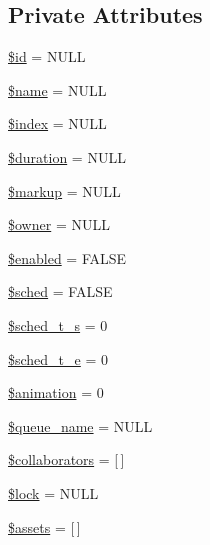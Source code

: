 \subsection*{Private Attributes}
\begin{DoxyCompactItemize}
\item 
\hyperlink{classlibresignage_1_1common_1_1php_1_1slide_1_1Slide_a7dd7de937f3bc73a1aadf56ca594fbdd}{\$id} = N\+U\+LL
\item 
\hyperlink{classlibresignage_1_1common_1_1php_1_1slide_1_1Slide_aa2936e4fd6eb208ce09d3d6987351d93}{\$name} = N\+U\+LL
\item 
\hyperlink{classlibresignage_1_1common_1_1php_1_1slide_1_1Slide_ad580560a42d379b63233bcd624d2025d}{\$index} = N\+U\+LL
\item 
\hyperlink{classlibresignage_1_1common_1_1php_1_1slide_1_1Slide_a2d650e91ab7423234d24955dff565cb8}{\$duration} = N\+U\+LL
\item 
\hyperlink{classlibresignage_1_1common_1_1php_1_1slide_1_1Slide_a254e9bd551ecdd771d99f50c43efb754}{\$markup} = N\+U\+LL
\item 
\hyperlink{classlibresignage_1_1common_1_1php_1_1slide_1_1Slide_aa70f5dd34e3605dfd0d298046eaa6e9d}{\$owner} = N\+U\+LL
\item 
\hyperlink{classlibresignage_1_1common_1_1php_1_1slide_1_1Slide_a819f22b6bc82f1a6961429ffea950e6e}{\$enabled} = F\+A\+L\+SE
\item 
\hyperlink{classlibresignage_1_1common_1_1php_1_1slide_1_1Slide_a8c6a04863a8424b9dc6957a843abe143}{\$sched} = F\+A\+L\+SE
\item 
\hyperlink{classlibresignage_1_1common_1_1php_1_1slide_1_1Slide_a976bff4c51294f1ab1ed91a84f993627}{\$sched\+\_\+t\+\_\+s} = 0
\item 
\hyperlink{classlibresignage_1_1common_1_1php_1_1slide_1_1Slide_adfcc309e69b9dd59eb92413fa1076d7e}{\$sched\+\_\+t\+\_\+e} = 0
\item 
\hyperlink{classlibresignage_1_1common_1_1php_1_1slide_1_1Slide_aecc8d50d071e37690946af8f814f9ff4}{\$animation} = 0
\item 
\hyperlink{classlibresignage_1_1common_1_1php_1_1slide_1_1Slide_af93ffac0cc6478cb95f66772785b08c8}{\$queue\+\_\+name} = N\+U\+LL
\item 
\hyperlink{classlibresignage_1_1common_1_1php_1_1slide_1_1Slide_acbc85425ac21b86ca870a8902b9f4594}{\$collaborators} = \mbox{[}$\,$\mbox{]}
\item 
\hyperlink{classlibresignage_1_1common_1_1php_1_1slide_1_1Slide_a94f554fe33375075dcfa3981750aedc2}{\$lock} = N\+U\+LL
\item 
\hyperlink{classlibresignage_1_1common_1_1php_1_1slide_1_1Slide_a2b746a6bfd18a1eca435c987bfc381b9}{\$assets} = \mbox{[}$\,$\mbox{]}
\end{DoxyCompactItemize}
